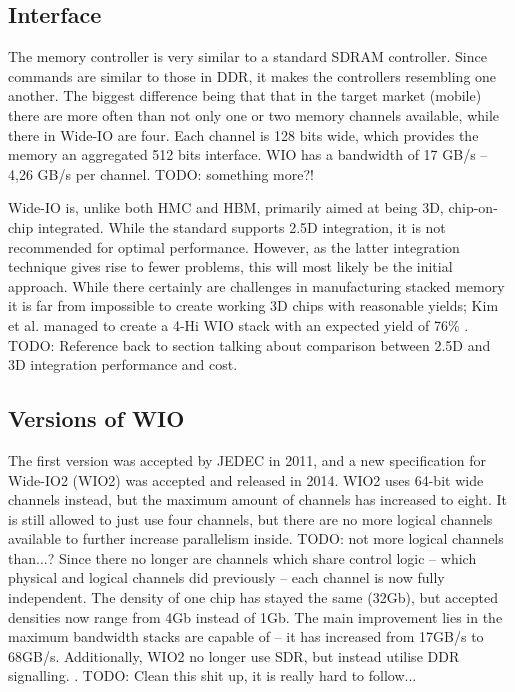 \subsection{Interface}
The memory controller is very similar to a standard SDRAM controller. Since commands are similar to those in DDR, it makes the controllers resembling one another. The biggest difference being that that in the target market (mobile) there are more often than not only one or two memory channels available, while there in Wide-IO are four. Each channel is 128 bits wide, which provides the memory an aggregated 512 bits interface. WIO has a bandwidth of 17 GB/s -- 4,26 GB/s per channel. TODO: something more?!
\bigskip

Wide-IO is, unlike both HMC and HBM, primarily aimed at being 3D, chip-on-chip integrated. While the standard supports 2.5D integration, it is not recommended for optimal performance. However, as the latter integration technique gives rise to fewer problems, this will most likely be the initial approach. While there certainly are challenges in manufacturing stacked memory it is far from impossible to create working 3D chips with reasonable yields; Kim et al. managed to create a 4-Hi WIO stack with an expected yield of 76\% \cite{kim20121}. TODO: Reference back to section talking about comparison between 2.5D and 3D integration performance and cost.

\subsection{Versions of WIO}
The first version was accepted by JEDEC in 2011, and a new specification for Wide-IO2 (WIO2) was accepted and released in 2014. WIO2 uses 64-bit wide channels instead, but the maximum amount of channels has increased to eight. It is still allowed to just use four channels, but there are no more logical channels available to further increase parallelism inside. TODO: not more logical channels than...? Since there no longer are channels which share control logic -- which physical and logical channels did previously -- each channel is now fully independent. The density of one chip has stayed the same (32Gb), but accepted densities now range from 4Gb instead of 1Gb. The main improvement lies in the maximum bandwidth stacks are capable of -- it has increased from 17GB/s to 68GB/s. Additionally, WIO2 no longer use SDR, but instead utilise DDR signalling. \cite{standard2014wide}. TODO: Clean this shit up, it is really hard to follow...

